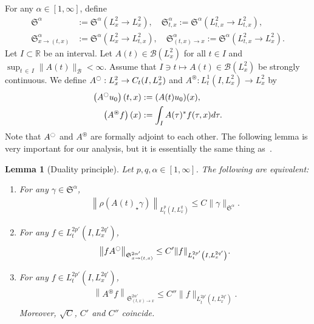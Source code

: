 \documentclass[10pt]{amsart}
\newtheorem{lemm}[theo]{Lemma}
\theoremstyle{definition}
\numberwithin{equation}{section}
\newcommand{\oast}{\circledast}
\newcommand{\CB}{\mathcal{B}}
\newcommand{\FS}{\mathfrak{S}}
\newcommand{\al}{\alpha}
\newcommand{\ga}{\gamma}
\newcommand{\ta}{\tau}
\newcommand{\rh}{\rho}
\newcommand{\I}{\infty}
\newcommand{\tx}{{t,x}}
\newcommand{\st}{\star}
\newcommand{\R}{\mathbb{R}}
\newcommand{\oc}{\ocircle}
\newcommand{\os}{\oast}
\begin{document}
For any $\al \in [1, \I]$, define
\begin{align}
\FS^\alpha &:= \FS^\alpha\left(L^2_x \to L^2_x\right),
\quad \FS^\al_{t,x} := \FS^\al\left(L^2_{t,x} \to L^2_\tx\right), \\
\FS^\al_{x \to (t,x)} &:= \FS^\al\left(L^2_x \to L^2_{t,x}\right),
\quad \FS^\alpha_{(t,x) \to x} := \FS^\al\left(L^2_{t,x} \to L^2_x\right).
\end{align}
Let $I \subset \R$ be an interval. Let $A(t) \in \CB(L^2_x)$ for all $t \in I$ and $\sup_{t \,\in\,I} \|A(t)\|_{\CB} < \I$. Assume that $I \ni t \mapsto A(t) \in \CB(L^2_x)$ be strongly continuous. We define $A^\ocircle : L^2_x \to C_t(I,L^2_x)$ and $A^\oast : L^1_t(I,L^2_x) \to L^2_x$ by
\begin{align}
\left(A^\ocircle u_0\right)(t,x) &:= (A(t)u_0)(x), \\
\left(A^\oast f\right)(x) &:= \int_I A(\ta)^* f(\ta,x) d\ta.
\end{align}
Note that $A^\ocircle$ and $A^\oast$ are formally adjoint to each other. The following lemma is very important for our analysis, but it is essentially the same thing as~\cite[Lemma~3]{2017FS}.
\begin{lemm}[Duality principle] \label{DP}
Let $p,q,\al \in [1,\I]$. The following are equivalent:
\begin{enumerate}
\item\label{lemm3.2.1} For any $\ga \in \FS^\al$,
\begin{align}\label{SS}
\left\|\rh(A(t)_\st \ga)\right\|_{L^p_t\left(I,L^q_x\right)} \le C \|\ga\|_{\FS^\al}.
\end{align}
\item\label{lemm3.2.2} For any $f \in L^{2p'}_t(I,L^{2q'}_x)$,
\begin{align}\label{HSS}
\left\|f A^\oc\right\|_{\FS^{2\al'}_{x \to (\tx)}} \le C'\|f\|_{L^{2p'}_t\left(I,L^{2q'}_x\right)}.
\end{align}
\item\label{lemm3.2.3} For any $f \in L^{2p'}_t(I,L^{2q'}_x)$,
\begin{align}\label{HSS-adjoint}
\left\|A^\os f\right\|_{\FS^{2\al'}_{(\tx) \to x}} \le C''\|f\|_{L^{2p'}_t\left(I,L^{2q'}_x\right)}.
\end{align}
Moreover, $\sqrt{C}$, $C'$ and $C''$ coincide.
\end{enumerate}
\end{lemm}
\end{document}

